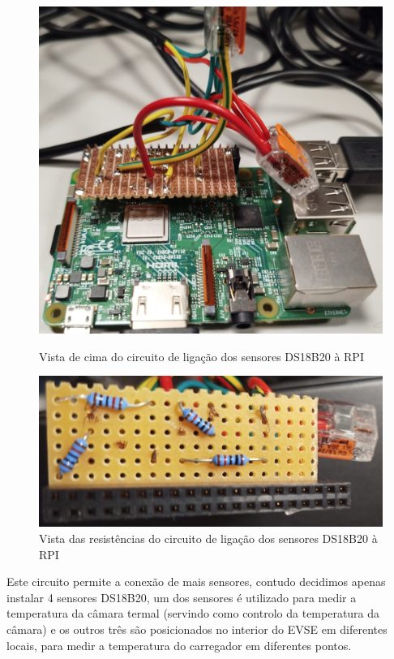 \begin{figure}[H]
    \centering
    \begin{minipage}{0.48\textwidth}
        \centering
        \includegraphics[width=\linewidth]{figures/circuit_1.png}
        \caption{Vista de cima do circuito de ligação dos sensores DS18B20 à RPI}
        \label{fig:circuit_1}
    \end{minipage}\hfill
    \begin{minipage}{0.48\textwidth}
        \centering
        \includegraphics[width=\linewidth]{figures/circuit_2.png}
        \caption{Vista das resistências do circuito de ligação dos sensores DS18B20 à RPI}
        \label{fig:circuit_2}
    \end{minipage}
\end{figure}


Este circuito permite a conexão de mais sensores, contudo decidimos apenas instalar 4 sensores DS18B20,
um dos sensores é utilizado para medir a temperatura da câmara termal (servindo como controlo da temperatura
da câmara) e os outros três são posicionados no interior do EVSE em diferentes locais, para medir a temperatura
do carregador em diferentes pontos.

